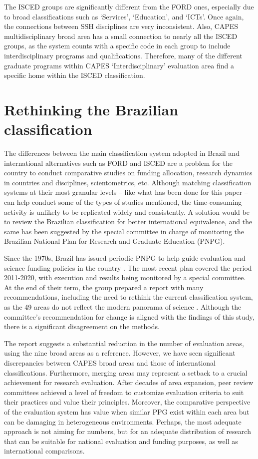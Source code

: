The ISCED groups are significantly different from the FORD ones, especially due to broad classifications such as ‘Services’, ‘Education’, and ‘ICTs’. Once again, the connections between SSH disciplines are very inconsistent. Also, CAPES multidisciplinary broad area has a small connection to nearly all the ISCED groups, as the system counts with a specific code in each group to include interdisciplinary programs and qualifications. Therefore, many of the different graduate programs within CAPES ‘Interdisciplinary’ evaluation area find a specific home within the ISCED classification.

\section{Rethinking the Brazilian classification}
\label{sec:classif:rethinking}

The differences between the main classification system adopted in Brazil and international alternatives such as FORD and ISCED are a problem for the country to conduct comparative studies on funding allocation, research dynamics in countries and disciplines, scientometrics, etc. Although matching classification systems at their most granular levels – like what has been done for this paper – can help conduct some of the types of studies mentioned, the time-consuming activity is unlikely to be replicated widely and consistently. A solution would be to review the Brazilian classification for better international equivalence, and the same has been suggested by the special committee in charge of monitoring the Brazilian National Plan for Research and Graduate Education (PNPG). 

Since the 1970s, Brazil has issued periodic PNPG to help guide evaluation and science funding policies in the country \autocite{Brasil.2020}. The most recent plan covered the period 2011-2020, with execution and results being monitored by a special committee. At the end of their term, the group prepared a report with many recommendations, including the need to rethink the current classification system, as the 49 areas do not reflect the modern panorama of science \autocite{CEPNPG.2020}. Although the committee’s recommendation for change is aligned with the findings of this study, there is a significant disagreement on the methods.

The \textcite{CEPNPG.2020} report suggests a substantial reduction in the number of evaluation areas, using the nine broad areas as a reference. However, we have seen significant discrepancies between CAPES broad areas and those of international classifications. Furthermore, merging areas may represent a setback to a crucial achievement for research evaluation. After decades of area expansion, peer review committees achieved a level of freedom to customize evaluation criteria to suit their practices and value their principles. Moreover, the comparative perspective of the evaluation system has value when similar PPG exist within each area but can be damaging in heterogeneous environments. Perhaps, the most adequate approach is not aiming for numbers, but for an adequate distribution of research that can be suitable for national evaluation and funding purposes, as well as international comparisons.

